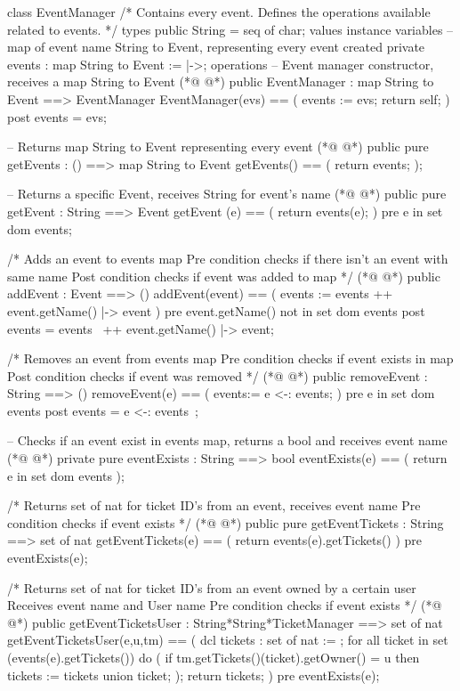 \begin{vdmpp}[breaklines=true]
class EventManager
/*
  Contains every event.
  Defines the operations available related to events.
*/
types
 public String = seq of char;
values
instance variables
 -- map of event name String to Event, representing every event created
 private events : map String to Event := {|->};
operations
 -- Event manager constructor, receives a map String to Event
(*@
\label{EventManager:14}
@*)
 public EventManager : map String to Event ==> EventManager
 EventManager(evs) == (
  events := evs;
  return self;
 )
 post events = evs;
 
 -- Returns map String to Event representing every event
(*@
\label{getEvents:22}
@*)
 public pure getEvents : () ==> map String to Event
 getEvents() == (
  return events;
 );
 
 -- Returns a specific Event, receives String for event's name
(*@
\label{getEvent:28}
@*)
 public pure getEvent : String ==> Event
 getEvent (e) == (
  return events(e);
 )
 pre e in set dom events;
 
 /*
  Adds an event to events map
  Pre condition checks if there isn't an event with same name
  Post condition checks if event was added to map
 */
(*@
\label{addEvent:39}
@*)
 public addEvent : Event ==> ()
 addEvent(event) == (
  events := events ++ {event.getName() |-> event}
 )
 pre event.getName() not in set dom events
 post events = events~ ++ {event.getName() |-> event};
 
 /*
  Removes an event from events map
  Pre condition checks if event exists in map
  Post condition checks if event was removed
 */
(*@
\label{removeEvent:51}
@*)
 public removeEvent : String ==> ()
 removeEvent(e) == (
  events:= {e} <-: events; 
 )
 pre e in set dom events
 post events = {e} <-: events~; 
 
 -- Checks if an event exist in events map, returns a bool and receives event name
(*@
\label{eventExists:59}
@*)
 private pure eventExists : String ==> bool
 eventExists(e) == (
  return e in set dom events
 );
 
 /*
  Returns set of nat for ticket ID's from an event, receives event name
  Pre condition checks if event exists
 */
(*@
\label{getEventTickets:68}
@*)
 public pure getEventTickets : String ==> set of nat
 getEventTickets(e) == (
  return events(e).getTickets()
 )
 pre eventExists(e);
 
 /*
  Returns set of nat for ticket ID's from an event owned by a certain user
  Receives event name and User name
  Pre condition checks if event exists
 */
(*@
\label{getEventTicketsUser:79}
@*)
 public getEventTicketsUser : String*String*TicketManager ==> set of nat
 getEventTicketsUser(e,u,tm) == (
  dcl tickets : set of nat := {};
  for all ticket in set (events(e).getTickets()) do 
  (
   if tm.getTickets()(ticket).getOwner() = u
    then tickets := tickets union {ticket};
  );
  return tickets;
 )
 pre eventExists(e);
 

\end{vdmpp}
